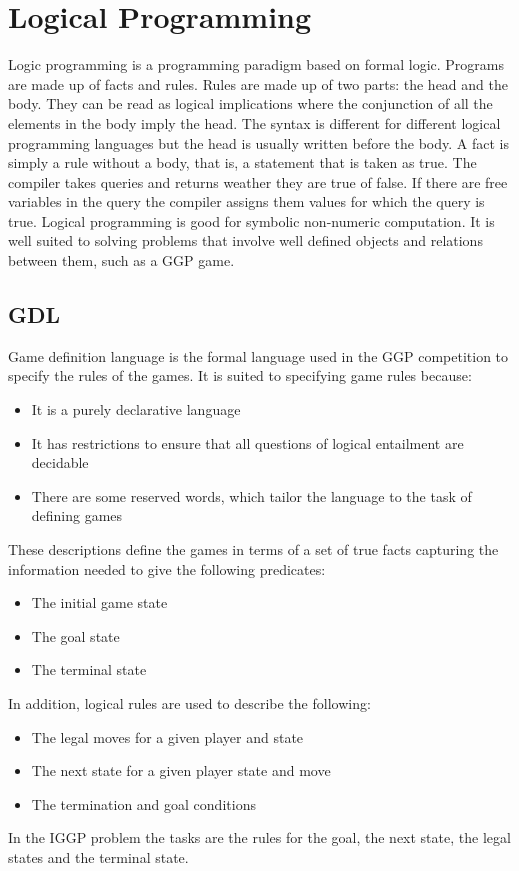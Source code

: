 \documentclass[a4paper,12pt]{report}
\begin{document}
\section{Logical Programming}
Logic programming is a programming paradigm based on formal logic. Programs are made up of facts and rules. Rules are made up of two parts: the head and the body. They can be read as logical implications where the conjunction of all the elements in the body imply the head. The syntax is different for different logical programming languages but the head is usually written before the body. A fact is simply a rule without a body, that is, a statement that is taken as true. The compiler takes queries and returns weather they are true of false. If there are free variables in the query the compiler assigns them values for which the query is true. Logical programming is good for symbolic non-numeric computation. It is well suited to solving problems that involve well defined objects and relations between them, such as a GGP game.
\subsection{GDL}\label{sec:GDL}
Game definition language is the formal language used in the GGP competition to specify the rules of the games.\cite{GDL_Spec} It is suited to specifying game rules because:
\begin{itemize}
\item It is a purely declarative language
\item It has restrictions to ensure that all questions of logical entailment are decidable
\item There are some reserved words, which tailor the language to the task of defining games
\end{itemize}
These descriptions define the games in terms of a set of true facts capturing the information needed to give the following predicates:
\begin{itemize}
\item The initial game state
\item The goal state
\item The terminal state
\end{itemize}
In addition, logical rules are used to describe the following:
\begin{itemize}
\item The legal moves for a given player and state
\item The next state for a given player state and move
\item The termination and goal conditions
\end{itemize}
In the IGGP problem the tasks are the rules for the goal, the next state, the legal states and the terminal state.
\end{document}
